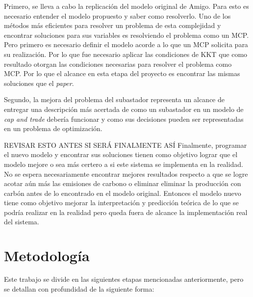 Primero, se lleva a cabo la replicación del modelo original de Amigo. Para esto es necesario entender el modelo propuesto y saber como resolverlo. Uno de los métodos más eficientes para resolver un problema de esta complejidad y encontrar soluciones para sus variables es resolviendo el problema como un MCP. Pero primero es necesario definir el modelo acorde a lo que un MCP solicita para su realización. Por lo que fue necesario aplicar las condiciones de KKT que como resultado otorgan las condiciones necesarias para resolver el problema como MCP. Por lo que el alcance en esta etapa del proyecto es encontrar las mismas soluciones que el \textit{paper}.
\vspace{2.5mm}

Segundo, la mejora del problema del subastador representa un alcance de entregar una descripción más acertada de como un subastador en un modelo de \textit{cap and trade} debería funcionar y como sus decisiones pueden ser representadas en un problema de optimización.
\vspace{2.5mm}

REVISAR ESTO ANTES SI SERÁ FINALMENTE ASÍ Finalmente, programar el nuevo modelo y encontrar sus soluciones tienen como objetivo lograr que el modelo mejore o sea más certero a si este sistema se implementa en la realidad. No se espera necesariamente encontrar mejores resultados respecto a que se logre acotar aún más las emisiones de carbono o eliminar eliminar la producción con carbón antes de lo encontrado en el modelo original. Entonces el modelo nuevo tiene como objetivo mejorar la interpretación y predicción teórica de lo que se podría realizar en la realidad pero queda fuera de alcance la implementación real del sistema.  

\section{Metodología}
Este trabajo se divide en las siguientes etapas mencionadas anteriormente, pero se detallan con profundidad de la siguiente forma:

